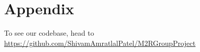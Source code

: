 \section{Appendix}\label{sec:appendix}
To see our codebase, head to \url{https://github.com/ShivamAmratlalPatel/M2RGroupProject}
\listofalgorithms
\listoffigures